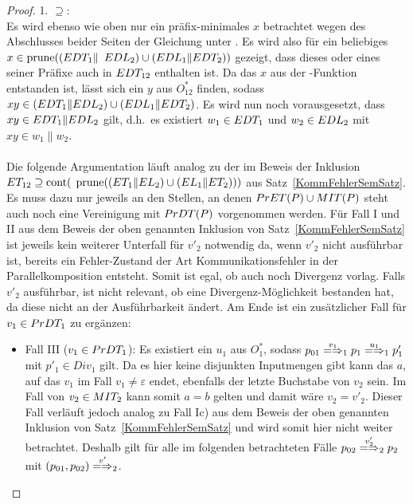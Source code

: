 \begin{proof}
  1. \glqq$\supseteq$\grqq{}:\\
  Es wird ebenso wie oben nur ein präfix-minimales $x$ betrachtet wegen des
  Abschlusses beider Seiten der Gleichung unter \cont{}. Es wird also für ein
  beliebiges $x\in\mathrm{prune} ((EDT _1\|$ $EDL _2)\cup (EDL _1\|EDT _2))$ gezeigt,
  dass dieses oder eines seiner Präfixe auch in $EDT _{12}$ enthalten ist. Da
  das $x$ aus der \prune{}-Funktion entstanden ist, lässt sich ein $y$ aus
  $O^*_{12}$ finden, sodass $xy\in (EDT _1\|EDL _2)\cup (EDL _1\|EDT _2)$.
  Es wird nun noch vorausgesetzt, dass \oBdA{} $xy\in EDT _1\|EDL _2$ gilt,
  d.h.\ es existiert $w_1\in EDT _1$ und $w_2\in EDL _2$ mit $xy\in
  w_1\|w_2$.\\
  \\
  Die folgende Argumentation läuft analog zu der im Beweis der Inklusion $ET
  _{12} \supseteq \mathrm{cont}($ $\mathrm{prune} ((ET _1\|EL _2)\cup (EL _1\|ET _2)))$ aus
  Satz~\ref{KommFehlerSemSatz}. Es muss dazu nur jeweils an den Stellen, an
  denen $PrET (P)\cup MIT (P)$ steht auch noch eine Vereinigung mit $PrDT
  (P)$ vorgenommen werden. Für Fall I und II aus dem Beweis der oben genannten
  Inklusion von Satz~\ref{KommFehlerSemSatz} ist jeweils kein weiterer
  Unterfall für $v'_2$ notwendig da, wenn $v'_2$ nicht ausführbar ist, bereits
  ein Fehler-Zustand der Art Kommunikationsfehler in der Parallelkomposition
  entsteht. Somit ist egal, ob auch noch Divergenz vorlag. Falls $v'_2$
  ausführbar, ist nicht relevant, ob eine Divergenz-Möglichkeit bestanden hat,
  da diese nicht an der Ausführbarkeit ändert. Am Ende ist ein zusätzlicher
  Fall für $v_1\in PrDT _1$ zu ergänzen:
  \begin{itemize}
    \item Fall III ($v_1\in PrDT _1$): Es existiert ein $u_1$ aus $O^*_1$,
      sodass $p_{01}\weakmay[v_1]_1 p_1\weakmay[u_1]_1 p'_1$ mit $p'_1\in Div
      _1$ gilt. Da es hier keine disjunkten Inputmengen gibt kann das $a$, auf das $v_1$
      im Fall $v_1\neq\varepsilon$ endet, ebenfalls der letzte Buchstabe von $v_2$
      sein. Im Fall von $v_2\in MIT _2$ kann somit $a=b$ gelten und damit wäre
      $v_2=v'_2$. Dieser Fall verläuft jedoch analog zu Fall Ic) aus dem Beweis
     der oben genannten Inklusion von Satz~\ref{KommFehlerSemSatz} und wird
      somit hier nicht weiter betrachtet. Deshalb gilt für alle im folgenden
      betrachteten Fälle $p_{02}\weakmay[v'_2]_2 p_2$ mit $(p_{01},p_{02})
      \weakmay[v']_2$.
      \begin{itemize}

\end{itemize}
\end{itemize}
\end{proof}
